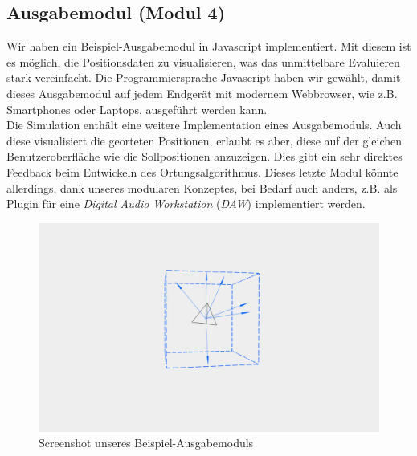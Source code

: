 \subsection{Ausgabemodul (Modul 4)}
Wir haben ein Beispiel-Ausgabemodul in Javascript implementiert. Mit diesem ist es möglich, die Positionsdaten zu visualisieren, was das unmittelbare Evaluieren stark vereinfacht. Die Programmiersprache Javascript haben wir gewählt, damit dieses Ausgabemodul auf jedem Endgerät mit modernem Webbrowser, wie z.B. Smartphones oder Laptops, ausgeführt werden kann.\\
Die Simulation enthält eine weitere Implementation eines Ausgabemoduls. Auch diese visualisiert die georteten Positionen, erlaubt es aber, diese auf der gleichen Benutzeroberfläche wie die Sollpositionen anzuzeigen. Dies gibt ein sehr direktes Feedback beim Entwickeln des Ortungsalgorithmus. Dieses letzte Modul könnte allerdings, dank unseres modularen Konzeptes, bei Bedarf auch anders, z.B. als Plugin für eine \textit{Digital Audio Workstation} (\textit{DAW}) implementiert werden.
\begin{figure}[H]
  \centering
  \includegraphics[width=\textwidth]{img/output}
  \caption{Screenshot unseres Beispiel-Ausgabemoduls}
  \label{fig:output}
\end{figure}
